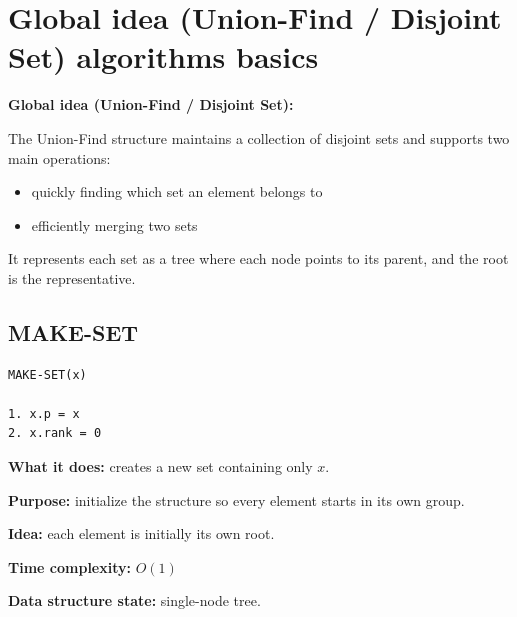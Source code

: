 \documentclass[11pt,a4paper,openany]{book}
\begin{document}
\vspace{2cm}





\section{Global idea (Union-Find / Disjoint Set) algorithms basics}



\textbf{Global idea (Union-Find / Disjoint Set):}

The Union-Find structure maintains a collection of disjoint sets and supports two main operations:
\begin{itemize}
    \item quickly finding which set an element belongs to
    \item efficiently merging two sets
\end{itemize}

It represents each set as a tree where each node points to its parent, and the root is the representative.



\vspace{2cm}





\subsection{MAKE-SET}



\begin{lstlisting}
MAKE-SET(x)

1. x.p = x
2. x.rank = 0
\end{lstlisting}

\textbf{What it does:} creates a new set containing only $x$.

\textbf{Purpose:} initialize the structure so every element starts in its own group.

\textbf{Idea:} each element is initially its own root.

\textbf{Time complexity:} $O(1)$

\textbf{Data structure state:} single-node tree.





\vspace{2cm}
\end{document}
